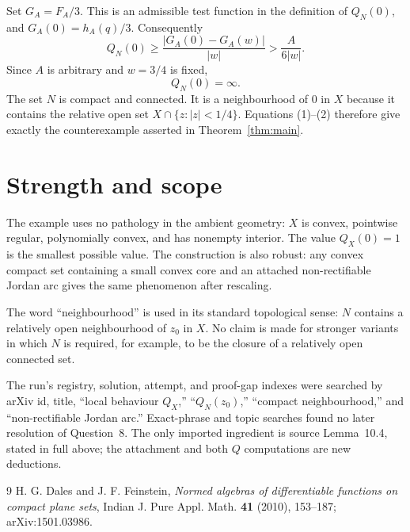 \documentclass[11pt]{article}
\newcommand{\abs}[1]{\lvert#1\rvert}
\begin{document}
Set $G_A=F_A/3$.  This is an admissible test function in the definition of
$Q_N(0)$, and $G_A(0)=h_A(q)/3$.  Consequently
\[
 Q_N(0)
 \ge \frac{\abs{G_A(0)-G_A(w)}}{\abs w}
 >\frac{A}{6\abs w}.
\]
Since $A$ is arbitrary and $w=3/4$ is fixed,
\[
 Q_N(0)=\infty.\tag{2}
\]
The set $N$ is compact and connected.  It is a neighbourhood of $0$ in $X$
because it contains the relative open set
$X\cap\{z:\abs z<1/4\}$.  Equations (1)--(2) therefore give exactly the
counterexample asserted in Theorem~\ref{thm:main}.

\section{Strength and scope}

The example uses no pathology in the ambient geometry: $X$ is convex,
pointwise regular, polynomially convex, and has nonempty interior.  The value
$Q_X(0)=1$ is the smallest possible value.  The construction is also robust:
any convex compact set containing a small convex core and an attached
non-rectifiable Jordan arc gives the same phenomenon after rescaling.

The word ``neighbourhood'' is used in its standard topological sense: $N$
contains a relatively open neighbourhood of $z_0$ in $X$.  No claim is made
for stronger variants in which $N$ is required, for example, to be the closure
of a relatively open connected set.

The run's registry, solution, attempt, and proof-gap indexes were searched by
arXiv id, title, ``local behaviour $Q_X$,'' ``$Q_N(z_0)$,'' ``compact
neighbourhood,'' and ``non-rectifiable Jordan arc.''  Exact-phrase and topic
searches found no later resolution of Question~8.  The only imported
ingredient is source Lemma~10.4, stated in full above; the attachment and both
$Q$ computations are new deductions.

\begin{thebibliography}{9}
H. G. Dales and J. F. Feinstein,
\emph{Normed algebras of differentiable functions on compact plane sets},
Indian J. Pure Appl. Math. \textbf{41} (2010), 153--187;
arXiv:1501.03986.
\end{thebibliography}
\end{document}
